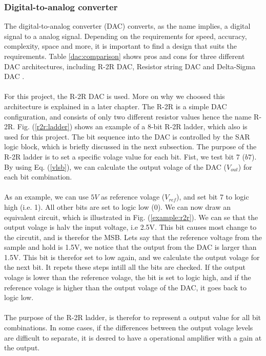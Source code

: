 \documentclass[english, 12pt, a4paper]{article}
\begin{document}
\subsubsection{Digital-to-analog converter}
The digital-to-analog converter (DAC) converts, as the name implies, a digital signal to a analog signal. Depending on the requirements for speed, accuracy, complexity, space and more, it is 
important to find a design that suits the requirements. Table \ref{dac:comparison} shows pros and cons for three different DAC architectures, including R-2R DAC, Resistor string DAC and 
Delta-Sigma DAC \cite{different-dac}. \\
\\
For this project, the R-2R DAC is used. More on why we choosed this architecture is explained in a later chapter. The R-2R is a simple DAC configuration, and consists of only two different 
resistor values hence the name R-2R. Fig. (\ref{r2r:ladder}) shows an example of a 8-bit R-2R ladder, which also is used for this project. The bit sequence into the DAC is controlled by the SAR logic
block, which is briefly discussed in the next subsection. The purpose of the R-2R ladder is to set a specific volage value for each bit. Fist, we test bit 7 (\(b7\)). By using Eq. (\ref{vlsb}), we 
can calculate the output volage of the DAC (\(V_{out}\)) for each bit combination.\\
\\
As an example, we can use \(5V\) as reference volage (\(V_{ref}\)), and set bit 7 to logic high (i.e. 1). All other bits are set to logic low (0). We can now draw an equivalent circuit, 
which is illustrated in Fig. (\ref{example:r2r}). We can se that the output volage is halv the input voltage, i.e 2.5V. 
This bit causes most change to the circutit, and is therefor the MSB. Lets say that the reference voltage from the sample and hold is 1.5V, we notice that the output from the DAC is larger than 1.5V.
This bit is therefor set to low again, and we calculate the output volage for the next bit. It repets these steps intill all the bits are checked. If the output volage is lower than the reference 
volage, the bit is set to logic high, and if the reference volage is higher than the output volage of the DAC, it goes back to logic low.\\
\\
The purpose of the R-2R ladder, is therefor to represent a output value for all bit combinations. In some cases, if the differences between the output volage levels are difficult to separate, 
it is desred to have a operational amplifier with a gain at the output. 
\end{document}

